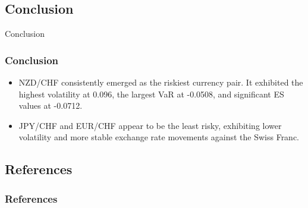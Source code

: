 \documentclass[10pt]{beamer}
\begin{document}
\begin{frame}
\section{Conclusion}
\centering \LARGE Conclusion
\end{frame}
\begin{frame}
\frametitle{Conclusion}
\begin{itemize}
    \item NZD/CHF consistently emerged as the riskiest currency pair. It exhibited the highest volatility at 0.096, the largest VaR at -0.0508, and significant ES values at -0.0712.
    \item JPY/CHF and EUR/CHF appear to be the least risky, exhibiting lower volatility and more stable exchange rate movements against the Swiss Franc. 
\end{itemize}
\end{frame}
\begin{frame}
\section{References}
\frametitle{References}
\printbibliography
\end{frame}
\end{document}
